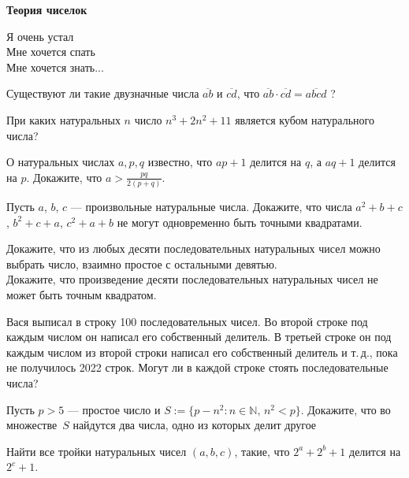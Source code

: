 \centerline{\bf \Huge Теория чиселок}

\begin{flushright}
        \scriptsize{Я очень устал\\
                    Мне хочется спать\\
                    Мне хочется знать...}
\end{flushright}

Существуют ли такие двузначные числа $\overline{a b}$ и $\overline{c d}$, что $\overline{a b} \cdot \overline{c d}=\overline{a b c d}$ ?

При каких натуральных $n$ число $n^3+2 n^2+11$ является кубом натурального числа?

О натуральных числах $a, p, q$ известно, что $a p+1$ делится на $q$, а $a q+1$ делится на $p$. Докажите, что $a>\frac{p q}{2(p+q)}$.

 Пусть $a$, $b$, $c$ --- произвольные натуральные числа. Докажите, что числа $a^2+b+c$, $b^2+c+a$, $c^2+a+b$ не могут одновременно быть точными квадратами.

Докажите, что из любых десяти последовательных натуральных чисел можно выбрать число, взаимно простое с остальными девятью.\\
Докажите, что произведение десяти последовательных натуральных чисел не может быть точным квадратом.

 Вася выписал в строку 100 последовательных чисел. Во второй строке под каждым числом он написал его собственный делитель. В третьей строке он под каждым числом из второй строки написал его собственный делитель и т.\,д., пока не получилось 2022 строк. Могут ли в каждой строке стоять последовательные числа?

  Пусть $p > 5$ --- простое число и $S:=\{p - n^2 \colon n \in \mathbb{N}, \, n^2 < p\}$. Докажите, что во множестве~$S$ найдутся два числа, одно из которых делит другое

 Найти все тройки натуральных чисел $(a,b,c)$, такие, что $2^a+2^b+1$ делится на $2^c+1$.

 
